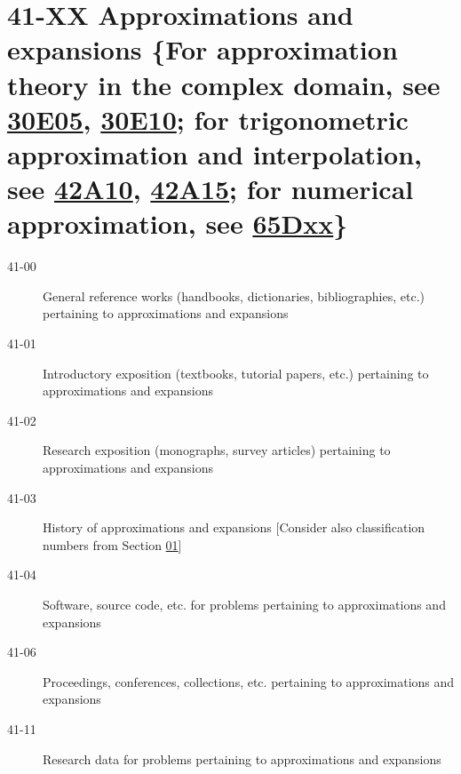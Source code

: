 \documentclass[letterpaper]{article}
\begin{document}
\section*{41-XX Approximations and expansions \{For approximation theory in the complex domain, see \hyperref[30E05]{30E05}, \hyperref[30E10]{30E10}; for trigonometric approximation and interpolation, see \hyperref[42A10]{42A10}, \hyperref[42A15]{42A15}; for numerical approximation, see \hyperref[65Dxx]{65Dxx}\} }\label{41-XX}
\begin{description}
\item [41-00]\label{41-00} General reference works (handbooks, dictionaries, bibliographies, etc.) pertaining to approximations and expansions
\item [41-01]\label{41-01} Introductory exposition (textbooks, tutorial papers, etc.) pertaining to approximations and expansions
\item [41-02]\label{41-02} Research exposition (monographs, survey articles) pertaining to approximations and expansions
\item [41-03]\label{41-03} History of approximations and expansions [Consider also classification numbers from Section \hyperref[01-XX]{01}]
\item [41-04]\label{41-04} Software, source code, etc. for problems pertaining to approximations and expansions
\item [41-06]\label{41-06} Proceedings, conferences, collections, etc. pertaining to approximations and expansions
\item [41-11]\label{41-11} Research data for problems pertaining to approximations and expansions
\end{description}
\end{document}
